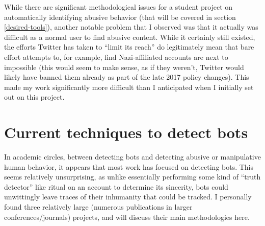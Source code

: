 \documentclass[11pt]{article}
\begin{document}
While there are significant methodological issues for a student project on automatically identifying abusive behavior (that will be covered in section \ref{desired-tools}), another notable problem that I observed was that it actually was difficult as a normal user to find abusive content. While it certainly still existed, the efforts Twitter has taken to ``limit its reach'' do legitimately mean that bare effort attempts to, for example, find Nazi-affiliated accounts are next to impossible (this would seem to make sense, as if they weren't, Twitter would likely have banned them already as part of the late 2017 policy changes). This made my work significantly more difficult than I anticipated when I initially set out on this project. 

\section{Current techniques to detect bots}
\label{bot-detect}
In academic circles, between detecting bots and detecting abusive or manipulative human behavior, it appears that most work has focused on detecting bots. This seems relatively unsurprising, as unlike essentially performing some kind of ``truth detector'' like ritual on an account to determine its sincerity, bots could unwittingly leave traces of their inhumanity that could be tracked. I personally found three relatively large (numerous publications in larger conferences/journals) projects, and will discuss their main methodologies here.
\end{document}

